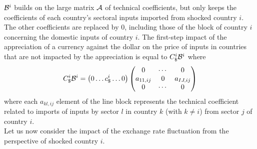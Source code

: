 \documentclass[11pt,a4paper]{paper} %
\begin{document}
${\cal B}^i$ builds on the large matrix ${\cal A}$ of technical coefficients, but only keeps the coefficients of each country's sectoral inputs imported from shocked country $i$. The other coefficients are replaced by 0, including those of the block of country $i$ concerning the domestic inputs of country $i$. 
The first-step impact of the appreciation of a currency against the dollar on the price of inputs in countries that are not impacted by the appreciation is equal to $C_\$^i{\cal B}^i$ where
\begin{eqnarray}
C_\$^i{\cal B}^i=\left(0\ldots c_\$^i \ldots 0\right)\left(\begin{matrix}0&\cdots&0\\a_{11,ij}&0&a_{IJ,ij}\\0&\cdots&0\\\end{matrix}\right) 	
\label{eq:eq3}
\end{eqnarray}
where each $a_{kl,ij}$ element of the line block represents the technical coefficient related to imports of inputs by sector $l$ in country $k$ (with $k\ne i$) from sector $j$ of country $i$.\\
Let us now consider the impact of the exchange rate fluctuation from the perspective of shocked country $i$.\\
\\%
%
%
\end{document}
